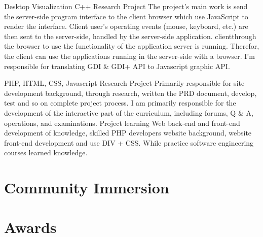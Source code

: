 \documentclass[11pt,a4paper]{moderncv}
\begin{document}
\vspace*{0.2\baselineskip}
{Desktop Visualization}
{C++}
{Research Project}{}
{The project's main work is send the server-side program interface to the client browser which use JavaScript to render the interface. 
Client user's operating events (mouse, keyboard, etc.) are then sent to the server-side, handled by the server-side application.
clientthrough the browser to use the functionality of the application server is running. Therefor, the client can use the
applications running in the server-side with a browser. I'm responsible for translating GDI & GDI+ API to Javascript graphic API.
}

\vspace*{0.2\baselineskip}
{}
{PHP, HTML, CSS, Javascript}
{Research Project}{}
{
Primarily responsible for site development background, through research, written the PRD document, develop, test and so on complete project process. I am primarily responsible for the development of the interactive part of the curriculum, including forums, Q & A, operations, and examinations. Project learning Web back-end and front-end development of knowledge, skilled PHP developers website background, website front-end development and use DIV + CSS. While practice software engineering courses learned knowledge.
}







\section{Community Immersion}

\section{Awards}
\end{document}

